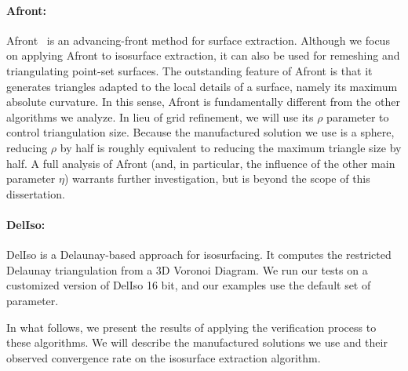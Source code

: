 \paragraph*{Afront:} Afront~\cite{Schreiner06} is an advancing-front method
for surface extraction. Although we focus on applying Afront to
isosurface extraction, it can also be used for remeshing and
triangulating point-set surfaces. The outstanding feature of Afront is
that it generates triangles adapted to the local details of a surface,
namely its maximum absolute curvature. In this sense, Afront is
fundamentally different from the other algorithms we analyze. In lieu
of grid refinement, we will use its $\rho$ parameter to control
triangulation size. Because the manufactured solution we use is a
sphere, reducing $\rho$ by half is roughly equivalent to reducing the
maximum triangle size by half. A full analysis of Afront (and, in
particular, the influence of the other main parameter $\eta$) warrants
further investigation, but is beyond the scope of this dissertation.

\paragraph*{DelIso:} DelIso \cite{Dey07} is a Delaunay-based 
approach for isosurfacing. It computes the restricted Delaunay triangulation 
from a 3D Voronoi Diagram. We run our tests on a customized version of DelIso 16 bit, 
and our examples use the default set of parameter.


In what follows, we present the results of applying the verification process 
to these algorithms. We will describe the manufactured solutions we use and
their observed convergence rate on the isosurface extraction algorithm.


